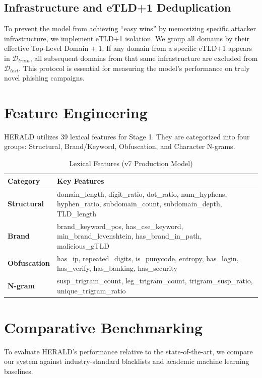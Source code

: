 \documentclass[journal]{IEEEtran}
\begin{document}
\subsection{Infrastructure and eTLD+1 Deduplication}
To prevent the model from achieving ``easy wins'' by memorizing specific attacker infrastructure, we implement eTLD+1 isolation. We group all domains by their effective Top-Level Domain + 1. If any domain from a specific eTLD+1 appears in $\mathcal{D}_{train}$, all subsequent domains from that same infrastructure are excluded from $\mathcal{D}_{test}$. This protocol is essential for measuring the model's performance on truly novel phishing campaigns.

\section{Feature Engineering}
HERALD utilizes 39 lexical features for Stage 1. They are categorized into four groups: Structural, Brand/Keyword, Obfuscation, and Character N-grams.

\begin{table}[h]
\centering
\caption{Lexical Features (v7 Production Model)}
\begin{tabular}{lp{5.5cm}}
\toprule
\textbf{Category} & \textbf{Key Features} \\
\midrule
\textbf{Structural} & domain\_length, digit\_ratio, dot\_ratio, num\_hyphens, hyphen\_ratio, subdomain\_count, subdomain\_depth, TLD\_length \\
\midrule
\textbf{Brand} & brand\_keyword\_pos, has\_cse\_keyword, min\_brand\_levenshtein, has\_brand\_in\_path, malicious\_gTLD \\
\midrule
\textbf{Obfuscation} & has\_ip, repeated\_digits, is\_punycode, entropy, has\_login, has\_verify, has\_banking, has\_security \\
\midrule
\textbf{N-gram} & susp\_trigram\_count, leg\_trigram\_count, trigram\_susp\_ratio, unique\_trigram\_ratio \\
\bottomrule
\end{tabular}
\end{table}

\section{Comparative Benchmarking}
To evaluate HERALD's performance relative to the state-of-the-art, we compare our system against industry-standard blacklists and academic machine learning baselines.
\end{document}
